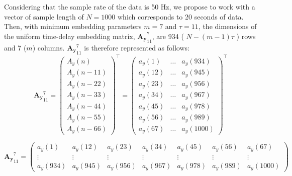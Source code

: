 Considering that the sample rate of the data is 50 Hz, we propose to work
with a vector of sample length of $N=1000$ which corresponds to 20 seconds 
of data. Then, with minimum embedding parameters $m=7$ and $\tau=11$, 
the dimensions of the uniform time-delay embedding matrix, 
$\boldsymbol{{A_y}}^{7}_{11}$, are 934 ( $N-(m-1)\tau$ ) rows and 
7 ($m$) columns. 
$\boldsymbol{{A_y}}^{7}_{11}$ is therefore represented as follows:
\begin{equation} \label{eq:etde1_exampleA2}
\boldsymbol{{A_y}}^{7}_{11}  =
\begin{pmatrix}
  	{ A_y }(n) \\
  	{ A_y }(n-11) \\
	{ A_y }(n-22) \\
	{ A_y }(n-33) \\
	{ A_y }(n-44) \\
	{ A_y }(n-55) \\
  	{ A_y }(n-66) 
\end{pmatrix}^\intercal
=
\begin{pmatrix}
  	a_y(1)  & \dots & a_y(934) \\
  	a_y(12) & \dots & a_y(945) \\
  	a_y(23) & \dots & a_y(956) \\
  	a_y(34) & \dots & a_y(967) \\
  	a_y(45) & \dots & a_y(978) \\
  	a_y(56) & \dots & a_y(989) \\
  	a_y(67) & \dots & a_y(1000) 
\end{pmatrix}^\intercal   
\end{equation}


\begin{equation} \label{eq:etde2_exampleA2}
\boldsymbol{{A_y}}^{7}_{11}  = 
\begin{pmatrix}
  	a_y(1) & a_y(12) & a_y(23) & a_y(34) & a_y(45) & a_y(56) &  a_y(67) \\ 
	\vdots & \vdots & \vdots & \vdots & \vdots & \vdots & \vdots \\
  	a_y(934) & a_y(945) & a_y(956) &  a_y(967) &  a_y(978) &  a_y(989) & a_y(1000) 
\end{pmatrix}
\end{equation}

